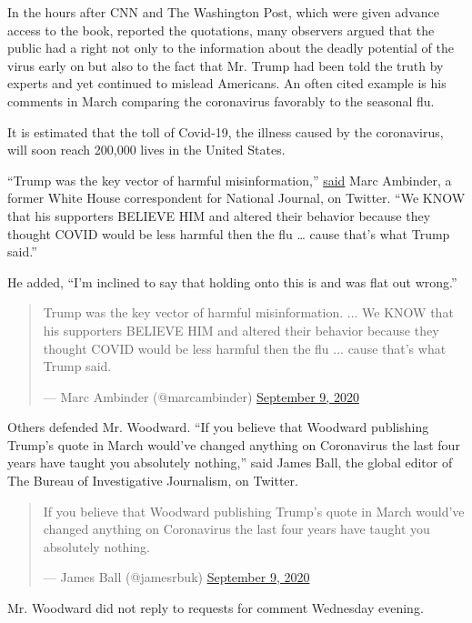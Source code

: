 In the hours after CNN and The Washington Post, which were given advance
access to the book, reported the quotations, many observers argued that
the public had a right not only to the information about the deadly
potential of the virus early on but also to the fact that Mr. Trump had
been told the truth by experts and yet continued to mislead Americans.
An often cited example is his comments in March comparing the
coronavirus favorably to the seasonal flu.

It is estimated that the toll of Covid-19, the illness caused by the
coronavirus, will soon reach 200,000 lives in the United States.

``Trump was the key vector of harmful misinformation,''
\href{https://twitter.com/marcambinder/status/1303829709902372864}{said}
Marc Ambinder, a former White House correspondent for National Journal,
on Twitter. ``We KNOW that his supporters BELIEVE HIM and altered their
behavior because they thought COVID would be less harmful then the flu
\ldots{} cause that's what Trump said.''

He added, ``I'm inclined to say that holding onto this is and was flat
out wrong.''

\begin{quote}
Trump was the key vector of harmful misinformation. ... We KNOW that his
supporters BELIEVE HIM and altered their behavior because they thought
COVID would be less harmful then the flu ... cause that's what Trump
said.

--- Marc Ambinder (@marcambinder)
\href{https://twitter.com/marcambinder/status/1303829709902372864?ref_src=twsrc\%5Etfw}{September
9, 2020}
\end{quote}

Others defended Mr. Woodward. ``If you believe that Woodward publishing
Trump's quote in March would've changed anything on Coronavirus the last
four years have taught you absolutely nothing,'' said James Ball, the
global editor of The Bureau of Investigative Journalism, on Twitter.

\begin{quote}
If you believe that Woodward publishing Trump's quote in March would've
changed anything on Coronavirus the last four years have taught you
absolutely nothing.

--- James Ball (@jamesrbuk)
\href{https://twitter.com/jamesrbuk/status/1303844204733435911?ref_src=twsrc\%5Etfw}{September
9, 2020}
\end{quote}

Mr. Woodward did not reply to requests for comment Wednesday evening.

